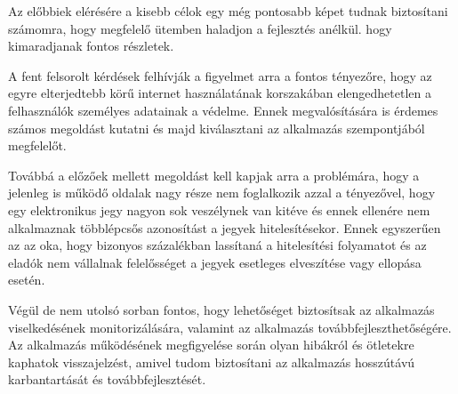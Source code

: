 Az előbbiek elérésére a kisebb célok egy még pontosabb képet tudnak biztosítani számomra, hogy megfelelő ütemben haladjon a fejlesztés anélkül. hogy kimaradjanak fontos részletek.

A fent felsorolt kérdések felhívják a figyelmet arra a fontos tényezőre, hogy az egyre elterjedtebb körű internet használatának korszakában elengedhetetlen a felhasználók személyes adatainak a védelme. Ennek megvalósítására is érdemes számos megoldást kutatni és majd kiválasztani az alkalmazás szempontjából megfelelőt.

Továbbá a előzőek mellett megoldást kell kapjak arra a problémára, hogy a jelenleg is működő oldalak nagy része nem foglalkozik azzal a tényezővel, hogy egy elektronikus jegy nagyon sok veszélynek van kitéve és ennek ellenére nem alkalmaznak többlépcsős azonosítást a jegyek hitelesítésekor. Ennek egyszerűen az az oka, hogy bizonyos százalékban lassítaná a hitelesítési folyamatot és az eladók nem vállalnak felelősséget a jegyek esetleges elveszítése vagy ellopása esetén.

Végül de nem utolsó sorban fontos, hogy lehetőséget biztosítsak az alkalmazás viselkedésének monitorizálására, valamint az alkalmazás továbbfejleszthetőségére. Az alkalmazás működésének megfigyelése során olyan hibákról és ötletekre kaphatok visszajelzést, amivel tudom biztosítani az alkalmazás hosszútávú karbantartását és továbbfejlesztését.